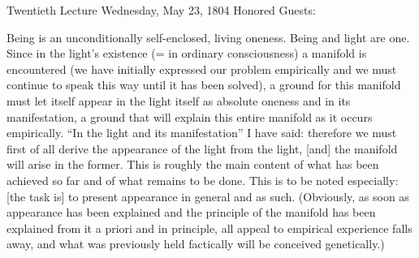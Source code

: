 Twentieth Lecture
Wednesday, May 23, 1804
Honored Guests:

Being is an unconditionally
self-enclosed, living oneness.
Being and light are one.
Since in the light's existence
(= in ordinary consciousness)
a manifold is encountered
(we have initially expressed our problem empirically
and we must continue to speak this way until it has been solved),
a ground for this manifold must let itself appear
in the light itself as absolute oneness
and in its manifestation,
a ground that will explain this entire manifold
as it occurs empirically.
“In the light and its manifestation”
I have said:
therefore we must first of all derive
the appearance of the light from the light,
[and] the manifold will arise in the former.
This is roughly the main content of
what has been achieved so far
and of what remains to be done.
This is to be noted especially:
[the task is] to present appearance in general and as such.
(Obviously, as soon as appearance has been explained
and the principle of the manifold has been explained
from it a priori and in principle,
all appeal to empirical experience falls away,
and what was previously held factically
will be conceived genetically.)

